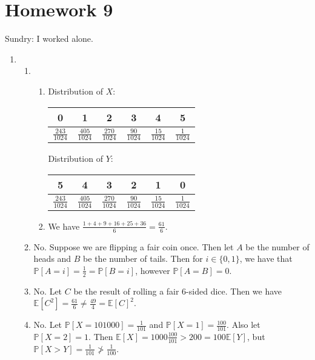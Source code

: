 \section{Homework 9}
Sundry: I worked alone.

\begin{enumerate}
    \item \begin{enumerate}
        \item \begin{enumerate}
            \setlength{\parskip}{6pt}
            \item Distribution of $X$:
            
            \begin{tabular}{c|c|c|c|c|c}
                0 & 1 & 2 & 3 & 4 & 5 \\
                \hline
                $\frac{243}{1024}$ & $\frac{405}{1024}$ & $\frac{270}{1024}$ & $\frac{90}{1024}$ & $\frac{15}{1024}$ & $\frac{1}{1024}$
            \end{tabular}
            
            Distribution of $Y$:
            
            \begin{tabular}{c|c|c|c|c|c}
                5 & 4 & 3 & 2 & 1 & 0 \\
                \hline
                $\frac{243}{1024}$ & $\frac{405}{1024}$ & $\frac{270}{1024}$ & $\frac{90}{1024}$ & $\frac{15}{1024}$ & $\frac{1}{1024}$
            \end{tabular}
            
            \item We have $\frac{1 + 4 + 9 + 16 + 25 + 36}{6} = \frac{61}{6}$.
        \end{enumerate}
        
        \item No. Suppose we are flipping a fair coin once. Then let $A$ be the number of heads and $B$ be the number of tails. Then for $i \in \{0, 1\}$, we have that $\mathbb{P}[A=i] = \frac{1}{2} = \mathbb{P}[B=i]$, however $\mathbb{P}[A=B] = 0$.
        
        \item No. Let $C$ be the result of rolling a fair 6-sided dice. Then we have $\mathbb{E}[C^2] = \frac{61}{6} \neq \frac{49}{4} = \mathbb{E}[C]^2$.
        
        \item No. Let $\mathbb{P}[X=101000] = \frac{1}{101}$ and $\mathbb{P}[X=1] = \frac{100}{101}$. Also let $\mathbb{P}[X=2] = 1$. Then $\mathbb{E}[X] = 1000\frac{100}{101} > 200 = 100\mathbb{E}[Y]$, but $\mathbb{P}[X > Y] = \frac{1}{101} \not> \frac{1}{100}$.
        

\end{enumerate}
\end{enumerate}
